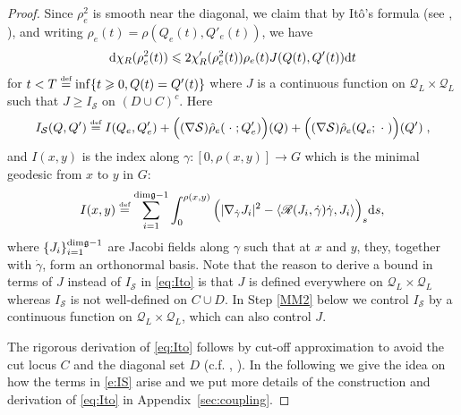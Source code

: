 \documentclass[11pt,UTF-8,reqno]{amsart}
\numberwithin{equation}{section}
\def\<{{\langle}}
\def\>{{\rangle}}
\def\dif{{\mathord{{\rm d}}}}
\newcommand{\eqdef}{\stackrel{\mbox{\tiny def}}{=}}
\def\cQ{{\mathcal Q}}
\def\cS{{\mathcal S}}
\def\sR{{\mathscr R}}
\def\geq{\geqslant}
\def\leq{\leqslant}
\def\<{{\langle}}
\def\>{{\rangle}}
\def\dif{{\mathord{{\rm d}}}}
\def\mfg{\mathfrak{g}}
\def\geq{\geqslant}
\def\leq{\leqslant}
\def\<{\langle} \def\>{\rangle}
\begin{document}
\begin{proof}
Since $\rho_e^2$ is smooth near the diagonal,	we claim that by It\^o's formula (see \cite[Section 2.1]{Wang}, \cite[Section 6.5]{Hsu}),
and writing $\rho_e(t)=\rho(Q_e(t),Q'_e(t))$,
 we have
	\begin{align}\label{eq:Ito}
		\dif \chi_R(\rho^2_e(t))\leq 2\chi_R'(\rho_e^2(t)) \rho_e(t)J(Q(t),Q'(t))\dif t
	\end{align}
for  $t<T \eqdef \inf\{t\geq 0,Q(t)=Q'(t)\}$ %
where
$J $ is a continuous function on $\cQ_L\times \cQ_L$
such that $J\geq I_{\cS}$ on $(D\cup C)^c$.
 Here
\begin{align}\label{e:IS}
	I_{\cS}(Q,Q') \eqdef I(Q_e,Q_e')
	+\Big((\nabla \cS)\hat\rho_e(\; \cdot \; ; Q_e')\Big)(Q)
	+\Big((\nabla \cS)\hat\rho_e(Q_e; \; \cdot\;)\Big)(Q')\;,
\end{align}
and $I(x,y)$ is the index along  $\gamma:[0,\rho(x,y)]\to G$ which is the minimal geodesic from $x$ to $y$ in $G$:
\begin{align*}
	I(x,y)\eqdef\sum_{i=1}^{\rm{dim}\mfg-1}\int_0^{\rho(x,y)}\Big(|\nabla_{\dot{\gamma}}J_i|^2-\<\sR(J_i,\dot \gamma)\dot\gamma,J_i\>\Big)_s\dif s,
\end{align*}
where $\{J_i\}_{i=1}^{\rm{dim}\mfg-1}$ are Jacobi fields along $\gamma$ such that at $x$ and $y$, they, together with $\dot\gamma$, form an orthonormal basis.
Note that
the reason to derive a bound in terms of  $J$ instead of $I_\cS$ in \eqref{eq:Ito}
is that
$J$   %
is defined everywhere on  $\cQ_L\times \cQ_L$  whereas $I_\cS$ is not well-defined on $C\cup D$.
 In Step \ref{MM2} below we control $I_\cS$ by a continuous function on $\cQ_L\times \cQ_L$, which can also control $J$.



The rigorous derivation of \eqref{eq:Ito} follows by cut-off approximation  to avoid the cut locus $C$ and the diagonal set $D$ (c.f. \cite[Theorem 2.1.1]{Wang}, \cite[Theorem 6.6.2]{Hsu}).
In the following we give the idea on how the terms in \eqref{e:IS} arise and we put more details of the construction and derivation of \eqref{eq:Ito} in Appendix~\ref{sec:coupling}.


\end{proof}
\end{document}
